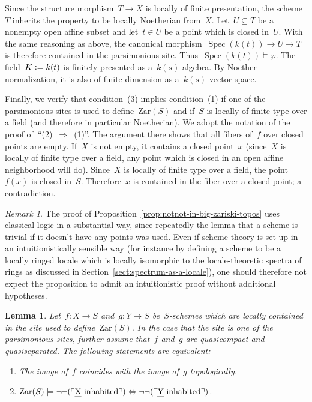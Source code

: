 \documentclass[10pt,reqno,a4paper]{amsbook}
\makeatletter
\theoremstyle{definition}
\theoremstyle{plain}
\newtheorem{lemma}[defn]{Lemma}
\theoremstyle{remark}
\newtheorem{rem}[defn]{Remark}
\let\oldul\ul
\renewcommand{\ul}[1]{\text{\oldul{$#1$}}}
\newcommand{\Zar}{\mathrm{Zar}}
\DeclareMathOperator{\Spec}{Spec}
\newcommand{\?}{\,{:}\,}
\renewcommand{\_}{\mathpunct{.}\,}
\newcommand{\speak}[1]{\ulcorner\text{\textnormal{#1}}\urcorner}
\newcommand{\defeq}{\vcentcolon=}
\renewenvironment{proof}[1][\proofname]{\par
  \pushQED{\qed}%
  \normalfont \topsep6\p@\@plus6\p@\relax
  \trivlist
  \item[\hskip\labelsep
        \itshape
    #1\@addpunct{.}]\ignorespaces
}{%
  \popQED\endtrivlist\@endpefalse
}
\makeatother
\begin{document}
\begin{proof}
Since the structure morphism~$T \to X$ is locally of finite presentation, the
scheme~$T$ inherits the property to be locally Noetherian from~$X$. Let~$U
\subseteq T$ be a nonempty open affine subset and let~$t \in U$ be a point
which is closed in~$U$. With the same reasoning as above, the canonical
morphism~$\Spec(k(t)) \to U \to T$ is therefore contained in the parsimonious
site. Thus~$\Spec(k(t)) \models \varphi$. The field~$K \defeq k(t)$ is finitely
presented as a~$k(s)$-algebra. By Noether normalization, it is also of finite
dimension as a~$k(s)$-vector space.

Finally, we verify that condition~(3) implies condition~(1) if one of the
parsimonious sites is used to define~$\Zar(S)$ and if~$S$ is locally
of finite type over a field (and therefore in particular Noetherian). We adopt
the notation of the proof of~``(2)~$\Rightarrow$~(1)''. The argument there
shows that all fibers of~$f$ over closed points are empty. If~$X$ is not empty,
it contains a closed point~$x$ (since~$X$ is locally of finite type over a field,
any point which is closed in an open affine neighborhood will do). Since~$X$
is locally of finite type over a field, the point~$f(x)$ is closed in~$S$.
Therefore~$x$ is contained in the fiber over a closed point; a contradiction.
\end{proof}

\begin{rem}The proof of Proposition~\ref{prop:notnot-in-big-zariski-topos} uses
classical logic in a substantial way, since repeatedly the lemma that a scheme
is trivial if it doesn't have any points was used. Even if scheme theory is
set up in an intuitionistically sensible way (for instance by defining a scheme to be
a locally ringed locale which is locally isomorphic to the locale-theoretic
spectra of rings as discussed in Section~\ref{sect:spectrum-as-a-locale}), one
should therefore not expect the proposition to admit an intuitionistic proof
without additional hypotheses.
\end{rem}

\begin{lemma}\label{lemma:image-coincides}
Let~$f : X \to S$ and~$g : Y \to S$ be~$S$-schemes which are locally contained
in the site used to define~$\Zar(S)$. In the case that the site is one of the
parsimonious sites, further assume that~$f$ and~$g$ are quasicompact and quasiseparated.
The following statements are equivalent:
\begin{enumerate}
\item The image of~$f$ coincides with the image of~$g$ topologically.
\item $\Zar(S) \models \neg\neg(\speak{$\ul{X}$ inhabited}) \Leftrightarrow
  \neg\neg(\speak{$\ul{Y}$ inhabited})$.
\end{enumerate}
\end{lemma}
\end{document}
